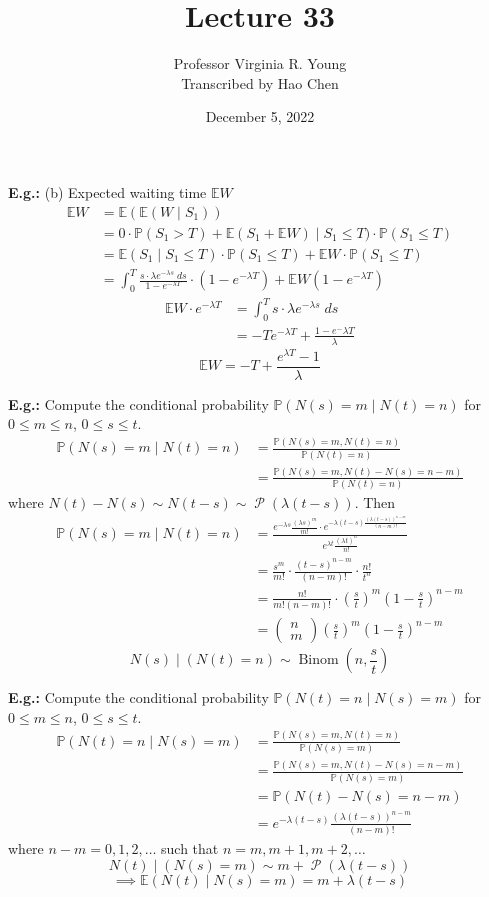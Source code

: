 \documentclass[a4paper]{article}
\title{Lecture 33}
\author{Professor Virginia R. Young\\ \small{Transcribed by Hao Chen}}
\date{December 5, 2022}
\newcommand{\n}{\hfill\break}
\newcommand{\eg}[1]{\par\noindent\settowidth{\hangindent}{\textbf{E.g.: }}\textbf{E.g.: }#1\n}
\newcommand{\Prob}{\mathbb{P}}
\renewcommand{\P}{\Prob}
\newcommand{\Avg}{\mathbb{E}}
\newcommand{\E}{\Avg}
\DeclareMathOperator{\Binom}{Binom}
\DeclareMathOperator{\Poiss}{\mathcal{P}}
\begin{document}
\maketitle

\eg{
(b) Expected waiting time $\E W$
\begin{align*}
    \E W&=\E(\E(W\mid S_1)) \\
    &=0\cdot\P(S_1>T)+\E(S_1+\E W)\mid S_1\leq T)\cdot\P(S_1\leq T) \\
    &=\E(S_1\mid S_1\leq T)\cdot\P(S_1\leq T)+\E W\cdot \P(S_1\leq T) \\
    &=\int^T_0 \frac{s\cdot\lambda e^{-\lambda s}\;ds}{1-e^{-\lambda T}}\cdot(1-e^{-\lambda T})+\E W(1-e^{-\lambda T})
\end{align*}
\begin{align*}
    \E W\cdot e^{-\lambda T}&=\int^T_0 s\cdot\lambda e^{-\lambda s}\;ds \\
    &=-Te^{-\lambda T}+\frac{1-e^-\lambda T}{\lambda}
\end{align*}
\[\E W=-T+\frac{e^{\lambda T}-1}{\lambda}\]
}

\eg{
Compute the conditional probability $\P(N(s)=m\mid N(t)=n)$ for $0\leq m \leq n$, $0\leq s\leq t$.
\begin{align*}
    \P(N(s)=m\mid N(t)=n)&=\frac{\P(N(s)=m, N(t)=n)}{\P(N(t)=n)} \\
    &=\frac{\P(N(s)=m, N(t)-N(s)=n-m)}{\P(N(t)=n)}
\end{align*}
where $N(t)-N(s)\sim N(t-s)\sim\Poiss(\lambda(t-s))$. Then
\begin{align*}
    \P(N(s)=m\mid N(t)=n)&=\frac{e^{-\lambda s}\frac{(\lambda s)^m}{m!}\cdot e^{-\lambda(t-s)\frac{(\lambda(t-s))^{n-m}}{(n-m)!}}}{e^{\lambda t}\frac{(\lambda t)^n}{n!}}\\
    &=\frac{s^m}{m!}\cdot\frac{(t-s)^{n-m}}{(n-m)!}\cdot \frac{n!}{t^n} \\
    &=\frac{n!}{m!(n-m)!}\cdot\left(\frac{s}{t}\right)^m\left(1-\frac{s}{t}\right)^{n-m} \\
    &=\begin{pmatrix} n \\ m \end{pmatrix}\left(\frac{s}{t}\right)^m\left(1-\frac{s}{t}\right)^{n-m}
\end{align*}
\[N(s)\mid (N(t)=n)\sim\Binom\left(n, \frac{s}{t}\right)\]
}

\eg{
Compute the conditional probability $\P(N(t)=n\mid N(s)=m)$ for $0\leq m \leq n$, $0\leq s\leq t$.
\begin{align*}
    \P(N(t)=n\mid N(s)=m)&=\frac{\P(N(s)=m, N(t)=n)}{\P(N(s)=m)} \\
    &=\frac{\P(N(s)=m, N(t)-N(s)=n-m)}{\P(N(s)=m)} \\
    &=\P(N(t)-N(s)=n-m) \\
    &=e^{-\lambda(t-s)}\frac{(\lambda(t-s))^{n-m}}{(n-m)!}
\end{align*}
where $n-m=0, 1, 2, \dots$ such that $n=m, m+1, m+2, \dots$
\[N(t)\mid (N(s)=m)\sim m+\Poiss(\lambda(t-s))\]
\[\implies\E(N(t)\mid N(s)=m)=m+\lambda(t-s)\]
}
\end{document}
